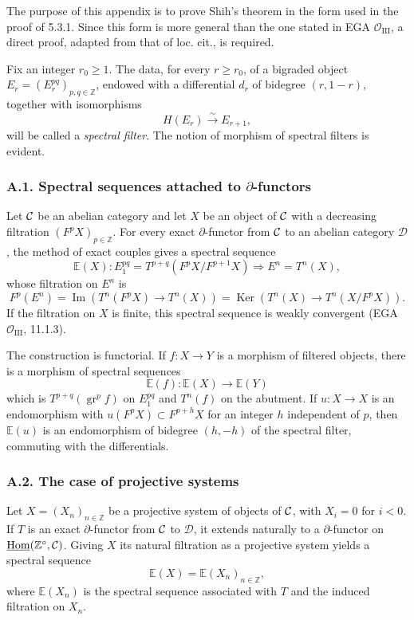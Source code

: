 \documentclass[11pt]{article}
\theoremstyle{plain}
\theoremstyle{definition}
\theoremstyle{remark}
\newcommand{\bZ}{\mathbb Z}
\newcommand{\cD}{\mathcal D}\newcommand{\cE}{\mathcal E}\newcommand{\cF}{\mathcal F}
\DeclareMathOperator{\Hom}{Hom}
\DeclareMathOperator{\Ker}{Ker}
\DeclareMathOperator{\Imn}{Im}
\DeclareMathOperator{\gr}{gr}
\begin{document}
The purpose of this appendix is to prove Shih's theorem in the form used in the proof
of 5.3.1. Since this form is more general than the one stated in EGA $\mathcal O_{\mathrm{III}}$,
a direct proof, adapted from that of loc. cit., is required.

Fix an integer $r_0\ge1$. The data, for every $r\ge r_0$, of a bigraded object
$E_r=(E_r^{pq})_{p,q\in\bZ}$, endowed with a differential $d_r$ of bidegree
$(r,1-r)$, together with isomorphisms
\[
        H(E_r)\xrightarrow{\sim}E_{r+1},
\]
will be called a \emph{spectral filter}. The notion of morphism of spectral filters
is evident.

\subsubsection*{A.1. Spectral sequences attached to $\partial$-functors}

Let $\mathcal C$ be an abelian category and let $X$ be an object of $\mathcal C$ with a decreasing
filtration $(F^pX)_{p\in\bZ}$. For every exact $\partial$-functor from $\mathcal C$ to an
abelian category $\cD$, the method of exact couples gives a spectral sequence
\[
        \mathbb E(X):E_1^{pq}=T^{p+q}(F^pX/F^{p+1}X)
        \Rightarrow E^n=T^n(X),
\]
whose filtration on $E^n$ is
\[
        F^p(E^n)=\Imn(T^n(F^pX)\to T^n(X))
        =\Ker(T^n(X)\to T^n(X/F^pX)).
\]
If the filtration on $X$ is finite, this spectral sequence is weakly convergent
(EGA $\mathcal O_{\mathrm{III}}$, 11.1.3).

The construction is functorial. If $f:X\to Y$ is a morphism of filtered objects,
there is a morphism of spectral sequences
\[
        \mathbb E(f):\mathbb E(X)\to\mathbb E(Y)
\]
which is $T^{p+q}(\gr^p f)$ on $E_1^{pq}$ and $T^n(f)$ on the abutment. If
$u:X\to X$ is an endomorphism with $u(F^pX)\subset F^{p+h}X$ for an integer $h$
independent of $p$, then $\mathbb E(u)$ is an endomorphism of bidegree $(h,-h)$ of
the spectral filter, commuting with the differentials.

\subsubsection*{A.2. The case of projective systems}

Let $X=(X_n)_{n\in\bZ}$ be a projective system of objects of $\mathcal C$, with
$X_i=0$ for $i<0$. If $T$ is an exact $\partial$-functor from $\mathcal C$ to $\cD$, it
extends naturally to a $\partial$-functor on
$\underline{\Hom}(\bZ^\circ,\cC)$. Giving $X$ its natural filtration as a projective
system yields a spectral sequence
\[
       \mathbb E(X)=\mathbb E(X_n)_{n\in\bZ},
\]
where $\mathbb E(X_n)$ is the spectral sequence associated with $T$ and the induced
filtration on $X_n$.
\end{document}
